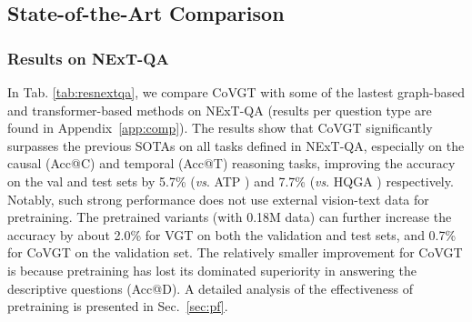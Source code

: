 \documentclass[10pt,journal,compsoc]{IEEEtran}
\newcommand{\vs}{\textit{vs}. }
\begin{document}
\subsection{State-of-the-Art Comparison}
\label{sec:cpsota}
\subsubsection{Results on NExT-QA}
In Tab. \ref{tab:resnextqa}, we compare CoVGT with some of the lastest graph-based and transformer-based methods on NExT-QA (results per question type are found in Appendix~\ref{app:comp}). The results show that CoVGT significantly surpasses the previous SOTAs on all tasks defined in NExT-QA, especially on the causal (Acc@C) and temporal (Acc@T) reasoning tasks, improving the accuracy on the val and test sets by 5.7\% (\vs ATP \cite{buch2022revisiting}) and 7.7\% (\vs HQGA \cite{xiao2021video}) respectively. Notably, such strong performance does not use external vision-text data for pretraining. The pretrained variants (with 0.18M data) can further increase the accuracy by about 2.0\% for VGT on both the validation and test sets, and 0.7\% for CoVGT on the validation set. The relatively smaller improvement for CoVGT is because pretraining has lost its dominated superiority in answering the descriptive questions (Acc@D). A detailed analysis of the effectiveness of pretraining is presented in Sec.~\ref{sec:pf}.
\end{document}
